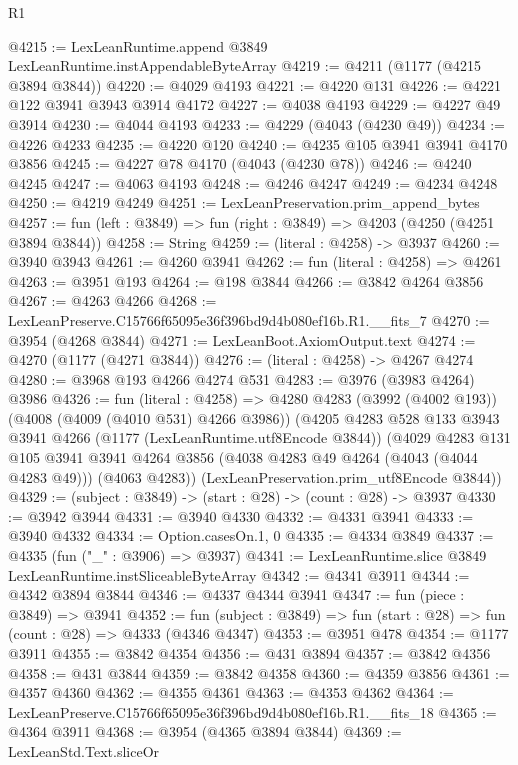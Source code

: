 \begin{lexlean}{R1}
\begin{coremodule}
@4215 := LexLeanRuntime.append @3849 LexLeanRuntime.instAppendableByteArray
@4219 := @4211 (@1177 (@4215 @3894 @3844))
@4220 := @4029 @4193
@4221 := @4220 @131
@4226 := @4221 @122 @3941 @3943 @3914 @4172
@4227 := @4038 @4193
@4229 := @4227 @49 @3914
@4230 := @4044 @4193
@4233 := @4229 (@4043 (@4230 @49))
@4234 := @4226 @4233
@4235 := @4220 @120
@4240 := @4235 @105 @3941 @3941 @4170 @3856
@4245 := @4227 @78 @4170 (@4043 (@4230 @78))
@4246 := @4240 @4245
@4247 := @4063 @4193
@4248 := @4246 @4247
@4249 := @4234 @4248
@4250 := @4219 @4249
@4251 := LexLeanPreservation.prim_append_bytes
@4257 := fun (left : @3849) => fun (right : @3849) => @4203 (@4250 (@4251 @3894 @3844))
@4258 := String
@4259 := (literal : @4258) -> @3937
@4260 := @3940 @3943
@4261 := @4260 @3941
@4262 := fun (literal : @4258) => @4261
@4263 := @3951 @193
@4264 := @198 @3844
@4266 := @3842 @4264 @3856
@4267 := @4263 @4266
@4268 := LexLeanPreserve.C15766f65095e36f396bd9d4b080ef16b.R1.__fits_7
@4270 := @3954 (@4268 @3844)
@4271 := LexLeanBoot.AxiomOutput.text
@4274 := @4270 (@1177 (@4271 @3844))
@4276 := (literal : @4258) -> @4267 @4274
@4280 := @3968 @193 @4266 @4274 @531
@4283 := @3976 (@3983 @4264) @3986
@4326 := fun (literal : @4258) =>
  @4280
    @4283
    (@3992 (@4002 @193))
    (@4008 (@4009 (@4010 @531) @4266 @3986))
    (@4205
      @4283
      @528
      @133
      @3943
      @3941
      @4266
      (@1177 (LexLeanRuntime.utf8Encode @3844))
      (@4029
        @4283
        @131
        @105
        @3941
        @3941
        @4264
        @3856
        (@4038 @4283 @49 @4264 (@4043 (@4044 @4283 @49)))
        (@4063 @4283))
      (LexLeanPreservation.prim_utf8Encode @3844))
@4329 := (subject : @3849) -> (start : @28) -> (count : @28) -> @3937
@4330 := @3942 @3944
@4331 := @3940 @4330
@4332 := @4331 @3941
@4333 := @3940 @4332
@4334 := Option.casesOn.{1, 0}
@4335 := @4334 @3849
@4337 := @4335 (fun ("_" : @3906) => @3937)
@4341 := LexLeanRuntime.slice @3849 LexLeanRuntime.instSliceableByteArray
@4342 := @4341 @3911
@4344 := @4342 @3894 @3844
@4346 := @4337 @4344 @3941
@4347 := fun (piece : @3849) => @3941
@4352 := fun (subject : @3849) => fun (start : @28) => fun (count : @28) => @4333 (@4346 @4347)
@4353 := @3951 @478
@4354 := @1177 @3911
@4355 := @3842 @4354
@4356 := @431 @3894
@4357 := @3842 @4356
@4358 := @431 @3844
@4359 := @3842 @4358
@4360 := @4359 @3856
@4361 := @4357 @4360
@4362 := @4355 @4361
@4363 := @4353 @4362
@4364 := LexLeanPreserve.C15766f65095e36f396bd9d4b080ef16b.R1.__fits_18
@4365 := @4364 @3911
@4368 := @3954 (@4365 @3894 @3844)
@4369 := LexLeanStd.Text.sliceOr

\end{coremodule}
\end{lexlean}
